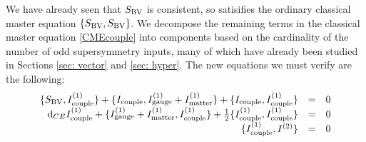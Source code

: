 \documentclass[10pt, oneside]{article}
\begin{document}
We have already seen that $S_{\rm BV}$ is consistent, so satisifies the ordinary classical master equation $\{S_{\rm BV}, S_{\rm BV}\}$. 
We decompose the remaining terms in the classical master equation \ref{CMEcouple} into components based on the cardinality of the number of odd supersymmetry inputs, many of which have already been studied in Sections \ref{sec: vector} and \ref{sec: hyper}. 
The new equations we must verify are the following:
\begin{equation}\label{CMEhyper2}
\begin{array}{rrrrrr}
\{S_{\rm BV} , I^{(1)}_{\rm couple}\} + \{I_{\rm couple}, I^{(1)}_{\rm gauge} + I^{(1)}_{\rm matter}\} + \{I_{\rm couple}, I^{(1)}_{\rm couple}\} & = & 0 \\ 
{\rm d}_{CE} I^{(1)}_{\rm couple} + \{I^{(1)}_{\rm gauge} + I^{(1)}_{\rm matter}, I^{(1)}_{\rm couple}\} + \frac{1}{2} \{I_{\rm couple}^{(1)}, I_{\rm couple}^{(1)}\} & = & 0 \\
\{I_{\rm couple}^{(1)}, I^{(2)}\} & =& 0 \\
\end{array}
\end{equation}
\end{document}
